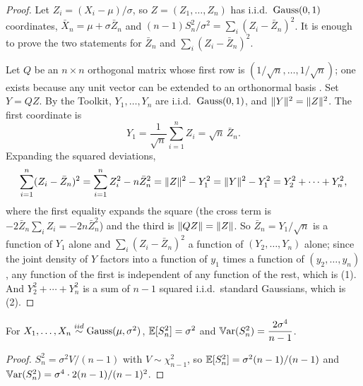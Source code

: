 \begin{proof}
Let $Z_i = (X_i - \mu)/\sigma$, so $Z = (Z_1, \ldots, Z_n)$ has i.i.d.\ $\text{Gauss}(0,1)$ coordinates, $\bar{X}_n = \mu + \sigma\bar{Z}_n$ and $(n-1)S_n^2/\sigma^2 = \sum_i (Z_i - \bar{Z}_n)^2$.
It is enough to prove the two statements for $\bar{Z}_n$ and $\sum_i (Z_i - \bar{Z}_n)^2$.

Let $Q$ be an $n \times n$ orthogonal matrix whose first row is $(1/\sqrt{n}, \ldots, 1/\sqrt{n})$; one exists because any unit vector can be extended to an orthonormal basis .
Set $Y = QZ$.
By the Toolkit, $Y_1, \ldots, Y_n$ are i.i.d.\ $\text{Gauss}(0,1)$, and $\lVert Y\rVert^2 = \lVert Z\rVert^2$.
The first coordinate is
\[
Y_1 = \frac{1}{\sqrt{n}}\sum_{i=1}^n Z_i = \sqrt{n}\,\bar{Z}_n.
\]
Expanding the squared deviations,
\[
\sum_{i=1}^n (Z_i - \bar{Z}_n)^2 = \sum_{i=1}^n Z_i^2 - n\bar{Z}_n^2 = \lVert Z\rVert^2 - Y_1^2 = \lVert Y\rVert^2 - Y_1^2 = Y_2^2 + \cdots + Y_n^2,
\]
where the first equality expands the square (the cross term is $-2\bar{Z}_n\sum_i Z_i = -2n\bar{Z}_n^2$) and the third is $\lVert QZ\rVert = \lVert Z\rVert$.
So $\bar{Z}_n = Y_1/\sqrt{n}$ is a function of $Y_1$ alone and $\sum_i(Z_i - \bar{Z}_n)^2$ a function of $(Y_2, \ldots, Y_n)$ alone; since the joint density of $Y$ factors into a function of $y_1$ times a function of $(y_2, \ldots, y_n)$ , any function of the first is independent of any function of the rest, which is (1).
And $Y_2^2 + \cdots + Y_n^2$ is a sum of $n - 1$ squared i.i.d.\ standard Gaussians, which is (2).
\end{proof}

\begin{corollary}
\label{cor:samplevar}
For $X_1, \ldots, X_n \stackrel{iid}{\sim} \text{Gauss}(\mu, \sigma^2)$, $\operatorname*{\mathbb{E}}[S_n^2] = \sigma^2$ and $\operatorname*{\mathbb{V}\text{ar}}(S_n^2) = \dfrac{2\sigma^4}{n-1}$.
\end{corollary}
\begin{proof}
$S_n^2 = \sigma^2 V/(n-1)$ with $V \sim \chi^2_{n-1}$, so $\operatorname*{\mathbb{E}}[S_n^2] = \sigma^2(n-1)/(n-1)$ and $\operatorname*{\mathbb{V}\text{ar}}(S_n^2) = \sigma^4 \cdot 2(n-1)/(n-1)^2$.
\end{proof}

